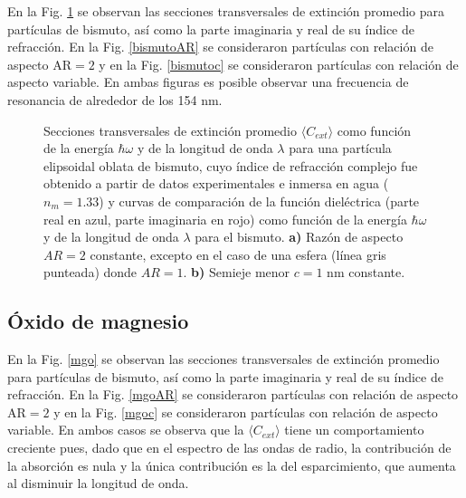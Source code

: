 En la Fig. \ref{bismuto} se observan las secciones transversales de extinción promedio para partículas de bismuto, así como la parte imaginaria y real de su índice de refracción. En la Fig. \ref{bismutoAR} se consideraron partículas con relación de aspecto AR$=2$  y en la Fig. \ref{bismutoc} se consideraron partículas con relación de aspecto variable. En ambas figuras es posible observar una frecuencia de resonancia de alrededor de los 154 nm.

\begin{figure}[H]
	\quad%
	\caption{Secciones transversales de extinción promedio $\langle C_{ext}\rangle$ como función de la energía $\hbar\omega$ y de la longitud de onda $\lambda$ para una partícula elipsoidal oblata de bismuto, cuyo índice de refracción complejo fue obtenido a partir de datos experimentales  e inmersa en agua ($n_m=1.33$) y curvas de comparación de la función dieléctrica (parte real en azul, parte imaginaria en rojo) como función de la energía $\hbar\omega$ y de la longitud de onda $\lambda$ para el bismuto. \textbf{a)} Razón de aspecto $AR=2$ constante, excepto en el caso de una esfera (línea gris punteada) donde $AR=1$. \textbf{b)} Semieje menor $c=1$ nm constante.}\label{bismuto}
\end{figure}


\subsection*{Óxido de magnesio}
En la Fig. \ref{mgo} se observan las secciones transversales de extinción promedio para partículas de bismuto, así como la parte imaginaria y real de su índice de refracción. En la Fig. \ref{mgoAR} se consideraron partículas con relación de aspecto AR$=2$  y en la Fig. \ref{mgoc} se consideraron partículas con relación de aspecto variable. En ambos casos se observa que la $\langle C_{ext}\rangle$ tiene un comportamiento creciente pues, dado que en el espectro de las ondas de radio, la contribución de la absorción es nula y la única contribución es la del esparcimiento, que aumenta al disminuir la longitud de onda.

